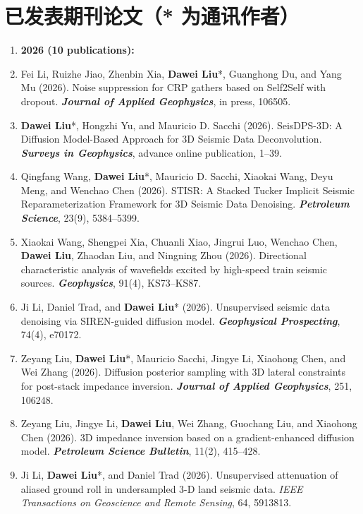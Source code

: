 \documentclass[11pt,a4paper]{article}
\begin{document}
\section{已发表期刊论文（\textbf{*} 为通讯作者）}
\begin{enumerate}[leftmargin=1.5em, itemsep=0pt, topsep=2pt]
  \item[] \hspace{-25pt} \textbf{2026 (10 publications):}

    \item Fei Li, Ruizhe Jiao, Zhenbin Xia, \textbf{Dawei Liu}*, Guanghong Du, and Yang Mu (2026). Noise suppression for CRP gathers based on Self2Self with dropout. \textit{\textbf{Journal of Applied Geophysics}}, in press, 106505.
    \item \textbf{Dawei Liu}*, Hongzhi Yu, and Mauricio D. Sacchi (2026). SeisDPS-3D: A Diffusion Model-Based Approach for 3D Seismic Data Deconvolution. \textit{\textbf{Surveys in Geophysics}}, advance online publication, 1--39.
    \item Qingfang Wang, \textbf{Dawei Liu}*, Mauricio D. Sacchi, Xiaokai Wang, Deyu Meng, and Wenchao Chen (2026). STISR: A Stacked Tucker Implicit Seismic Reparameterization Framework for 3D Seismic Data Denoising. \textit{\textbf{Petroleum Science}}, 23(9), 5384--5399.
    \item Xiaokai Wang, Shengpei Xia, Chuanli Xiao, Jingrui Luo, Wenchao Chen, \textbf{Dawei Liu}, Zhaodan Liu, and Ningning Zhou (2026). Directional characteristic analysis of wavefields excited by high-speed train seismic sources. \textit{\textbf{Geophysics}}, 91(4), KS73--KS87.
    \item Ji Li, Daniel Trad, and \textbf{Dawei Liu}* (2026). Unsupervised seismic data denoising via SIREN-guided diffusion model. \textit{\textbf{Geophysical Prospecting}}, 74(4), e70172.
    \item Zeyang Liu, \textbf{Dawei Liu}*, Mauricio Sacchi, Jingye Li, Xiaohong Chen, and Wei Zhang (2026). Diffusion posterior sampling with 3D lateral constraints for post-stack impedance inversion. \textit{\textbf{Journal of Applied Geophysics}}, 251, 106248.
    \item Zeyang Liu, Jingye Li, \textbf{Dawei Liu}, Wei Zhang, Guochang Liu, and Xiaohong Chen (2026). 3D impedance inversion based on a gradient-enhanced diffusion model. \textit{\textbf{Petroleum Science Bulletin}}, 11(2), 415--428.
    \item Ji Li, \textbf{Dawei Liu}*, and Daniel Trad (2026). Unsupervised attenuation of aliased ground roll in undersampled 3-D land seismic data. \textit{IEEE Transactions on Geoscience and Remote Sensing}, 64, 5913813.

\end{enumerate}
\end{document}
